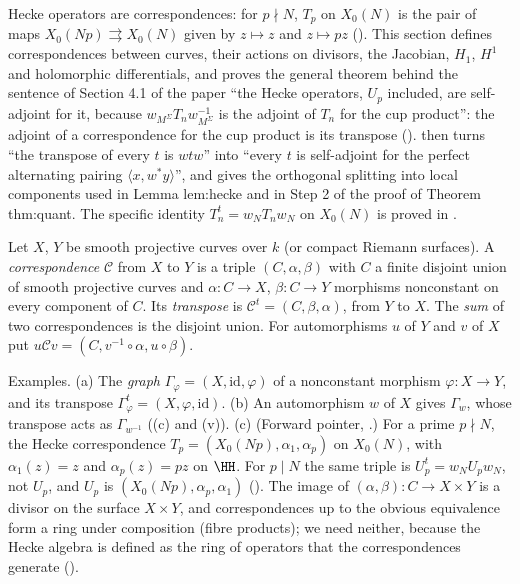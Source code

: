 Hecke operators are correspondences: for $p\nmid N$, $T_p$ on $X_0(N)$ is the pair of maps $X_0(Np)\rightrightarrows X_0(N)$ given by $z\mapsto z$ and $z\mapsto pz$ (). This section defines
correspondences between curves, their actions on divisors, the Jacobian, $H_1$, $H^1$ and holomorphic differentials, and proves the general theorem behind the sentence of
Section 4.1 of the paper ``the Hecke operators, $U_p$ included, are self-adjoint for it, because $w_{M^\Sigma}T_nw_{M^\Sigma}^{-1}$ is the adjoint of $T_n$ for the cup product'': the
adjoint of a correspondence for the cup product is its transpose ().  then turns ``the transpose of every $t$ is
$wtw$'' into ``every $t$ is self-adjoint for the perfect alternating pairing $\langle x,w^*y\rangle$'', and gives the orthogonal splitting into local components used in Lemma lem:hecke
and in Step 2 of the proof of Theorem thm:quant. The specific identity $T_n^t=w_NT_nw_N$ on $X_0(N)$ is proved in .

\begin{definition}[correspondences]\label{def:curves:correspondence}
Let $X$, $Y$ be smooth projective curves over $k$ (or compact Riemann surfaces). A \emph{correspondence} $\mathcal C$ from $X$ to $Y$ is a triple $(C,\alpha,\beta)$ with $C$ a finite disjoint
union of smooth projective curves and $\alpha\colon C\to X$, $\beta\colon C\to Y$ morphisms nonconstant on every component of $C$. Its \emph{transpose} is $\mathcal C^t=(C,\beta,\alpha)$, from $Y$
to $X$. The \emph{sum} of two correspondences is the disjoint union. For automorphisms $u$ of $Y$ and $v$ of $X$ put $u\mathcal Cv=(C,v^{-1}\circ\alpha,u\circ\beta)$.
\end{definition}

Examples. (a) The \emph{graph} $\Gamma_\varphi=(X,\mathrm{id},\varphi)$ of a nonconstant morphism $\varphi\colon X\to Y$, and its transpose $\Gamma_\varphi^t=(X,\varphi,\mathrm{id})$. (b) An automorphism $w$ of
$X$ gives $\Gamma_w$, whose transpose acts as $\Gamma_{w^{-1}}$ ((c) and (v)). (c) (Forward pointer,
.) For a prime $p\nmid N$, the Hecke correspondence $T_p=(X_0(Np),\alpha_1,\alpha_p)$ on $X_0(N)$, with $\alpha_1(z)=z$ and $\alpha_p(z)=pz$ on $\HH$. For $p\mid N$ the same triple is $U_p^t=w_NU_pw_N$, not $U_p$, and $U_p$ is
$(X_0(Np),\alpha_p,\alpha_1)$ (). The image of $(\alpha,\beta)\colon C\to X\times Y$ is a divisor on the surface $X\times Y$, and correspondences up to the obvious equivalence form a ring under composition (fibre
products); we need neither, because the Hecke algebra is defined as the ring of operators that the correspondences generate ().

